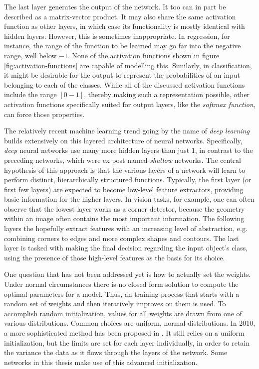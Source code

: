 \documentclass[11pt, a4paper]{article}
\begin{document}
The last layer generates the output of the network. It too can in part be described as a matrix-vector product. It may also share the same activation function as other layers, in which case its functionality is mostly identical with hidden layers. However, this is sometimes inappropriate. In regression, for instance, the range of the function to be learned may go far into the negative range, well below $-1$. None of the activation functions shown in figure \ref{fig:activation-functions} are capable of modelling this. Similarly, in classification, it might be desirable for the output to represent the probabilities of an input belonging to each of the classes. While all of the discussed activation functions include the range $[0-1]$, thereby making such a representation possible, other activation functions specifically suited for output layers, like the \emph{softmax function}, can force those properties.

The relatively recent machine learning trend going by the name of \emph{deep learning} builds extensively on this layered architecture of neural networks. Specifically, \emph{deep} neural networks use many more hidden layers than just 1, in contrast to the preceding networks, which were ex post named \emph{shallow} networks. The central hypothesis of this approach is that the various layers of a network will learn to perform distinct, hierarchically structured functions. Typically, the first layer (or first few layers) are expected to become low-level feature extractors, providing basic information for the higher layers. In vision tasks, for example, one can often observe that the lowest layer works as a corner detector, because the geometry within an image often contains the most important information. The following layers the hopefully extract features with an increasing level of abstraction, e.g. combining corners to edges and more complex shapes and contours. The last layer is tasked with making the final decision regarding the input object's class, using the presence of those high-level features as the basis for its choice.

One question that has not been addressed yet is how to actually set the weights. Under normal circumstances there is no closed form solution to compute the optimal parameters for a model. Thus, an training process that starts with a random set of weights and then iteratively improves on them is used. To accomplish random initialization, values for all weights are drawn from one of various distributions. Common choices are uniform, normal distributions. In 2010, a more sophisticated method has been proposed in \cite{glorot-understanding-deep-nn-training}. It still relies on a uniform initialization, but the limits are set for each layer individually, in order to retain the variance the data as it flows through the layers of the network. Some networks in this thesis make use of this advanced initialization.
\end{document}
